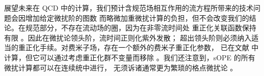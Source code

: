 展望未来在 QCD 中的计算，我们预计含规范场相互作用的流方程所带来的技术问题会因增加给定微扰阶的图数
而略微加重微扰计算的负担，但不会改变我们的结论。在规范部分，不存在流动场的圈，因为在非零流时间处
重正化关联函数保持有限 \cite{Luscher:2011bx}。因此在微扰论领头阶，流时间正则化紫外发散；
超出领头阶则必须纳入适当的重正化手续。对费米子场，存在一个额外的费米子重正化参数，
已在文献 \cite{Luscher:2013cpa} 中计算，但它可以通过考虑重正化群不变量而移除
\cite{Luscher:2013cpa}。我们还注意到，sOPE 的所有微扰计算都可以在连续统中进行，
无须诉诸通常更为繁琐的格点微扰论 \cite{Monahan:2013dla,Capitani:2002mp}。
